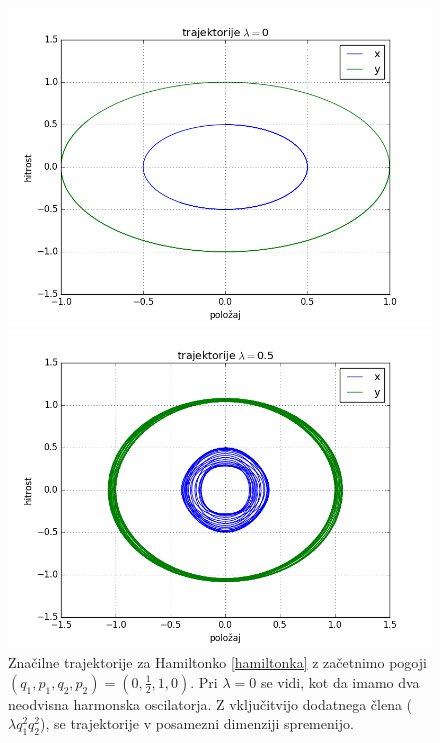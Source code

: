 \documentclass[slovene,11pt,a4paper]{article}
\numberwithin{equation}{section} %
\numberwithin{figure}{section} %
\numberwithin{table}{section} %
\begin{document}
\begin{figure}[!htb]
\centering
\begin{minipage}{0.5\textwidth}
\centering
\includegraphics[scale=0.45]{slike/trajektorije_0.png}
\end{minipage}\hfill
\begin{minipage}{0.5\textwidth}
\centering
\includegraphics[scale=0.45]{slike/trajektorije_1.png}
\end{minipage}

\caption{Značilne trajektorije za Hamiltonko \ref{hamiltonka} z začetnimo pogoji $(q_1,p_1,q_2,p_2)=(0,\frac{1}{2},1,0)$. Pri $\lambda=0$ se vidi, kot da imamo dva neodvisna harmonska oscilatorja. Z vključitvijo dodatnega člena ($\lambda q_1^2 q_2^2$), se trajektorije v posamezni dimenziji spremenijo. }
\end{figure}
\end{document}
